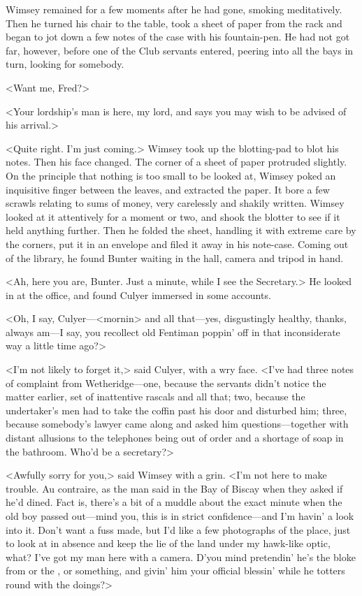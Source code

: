Wimsey remained for a few moments after he had gone, smoking meditatively. Then he turned his chair to the table, took a sheet of paper from the rack and began to jot down a few notes of the case with his fountain-pen. He had not got far, however, before one of the Club servants entered, peering into all the bays in turn, looking for somebody.

<Want me, Fred?>

<Your lordship's man is here, my lord, and says you may wish to be advised of his arrival.>

<Quite right. I'm just coming.> Wimsey took up the blotting-pad to blot his notes. Then his face changed. The corner of a sheet of paper protruded slightly. On the principle that nothing is too small to be looked at, Wimsey poked an inquisitive finger between the leaves, and extracted the paper. It bore a few scrawls relating to sums of money, very carelessly and shakily written. Wimsey looked at it attentively for a moment or two, and shook the blotter to see if it held anything further. Then he folded the sheet, handling it with extreme care by the corners, put it in an envelope and filed it away in his note-case. Coming out of the library, he found Bunter waiting in the hall, camera and tripod in hand.

<Ah, here you are, Bunter. Just a minute, while I see the Secretary.> He looked in at the office, and found Culyer immersed in some accounts.

<Oh, I say, Culyer—<mornin> and all that—yes, disgustingly healthy, thanks, always am—I say, you recollect old Fentiman poppin' off in that inconsiderate way a little time ago?>

<I'm not likely to forget it,> said Culyer, with a wry face. <I've had three notes of complaint from Wetheridge—one, because the servants didn't notice the matter earlier, set of inattentive rascals and all that; two, because the undertaker's men had to take the coffin past his door and disturbed him; three, because somebody's lawyer came along and asked him questions—together with distant allusions to the telephones being out of order and a shortage of soap in the bathroom. Who'd be a secretary?>

<Awfully sorry for you,> said Wimsey with a grin. <I'm not here to make trouble. Au contraire, as the man said in the Bay of Biscay when they asked if he'd dined. Fact is, there's a bit of a muddle about the exact minute when the old boy passed out—mind you, this is in strict confidence—and I'm havin' a look into it. Don't want a fuss made, but I'd like a few photographs of the place, just to look at in absence and keep the lie of the land under my hawk-like optic, what? I've got my man here with a camera. D'you mind pretendin' he's the bloke from  or the , or something, and givin' him your official blessin' while he totters round with the doings?>

